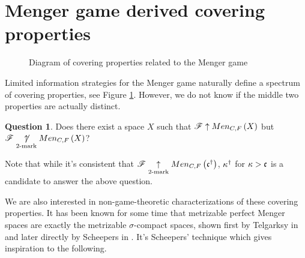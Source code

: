 \documentclass{amsart}
\theoremstyle{definition}
\newtheorem{question}[theorem]{Question}
\begin{document}
\section{Menger game derived covering properties}

\begin{figure}[h]
\begin{center}
\end{center}
\caption{Diagram of covering properties related to the Menger game}
\label{menSpec}
\end{figure}

Limited information strategies for the Menger game naturally define a spectrum
of covering properties, see Figure \ref{menSpec}. However,
we do not know if the middle two properties are actually distinct.

\begin{question}\label{perfectTo2Mark}
  Does there exist a space \(X\) such that \(\mathscr{F} \uparrow Men_{C,F}\left({X}\right)\) but
  \(\mathscr{F} \underset{2\text{-mark}}{\not\uparrow} Men_{C,F}\left({X}\right)\)?
\end{question}

Note that while it's consistent that
\(\mathscr{F}\underset{2\text{-mark}}{\uparrow}Men_{C,F}\left({\mathfrak{c}^\dagger}\right)\), \(\kappa^\dagger\)
for \(\kappa>\mathfrak{c}\) is a candidate to answer the above question.

We are also interested in non-game-theoretic characterizations of these
covering properties. It has been known for some time that metrizable perfect
Menger spaces are exactly the metrizable \(\sigma\)-compact spaces, shown first
by Telgarksy in \cite{MR753073} and later directly by Scheepers in
\cite{MR1273523}. It's Scheepers' technique which gives inspiration to
the following.
\end{document}
